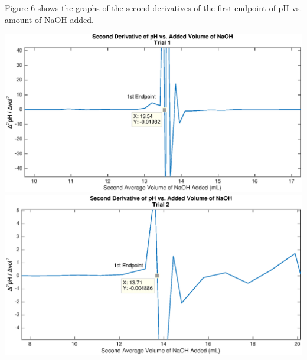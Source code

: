 \documentclass{article}
\begin{document}
Figure 6 shows the graphs of the second derivatives of the first endpoint of pH vs. amount of NaOH
added.
\begin{center}
        \includegraphics[scale=0.7]{2dev_1_1}
        \includegraphics[scale=0.7]{2dev_1_2}
\end{center}
\newpage 
\end{document}

